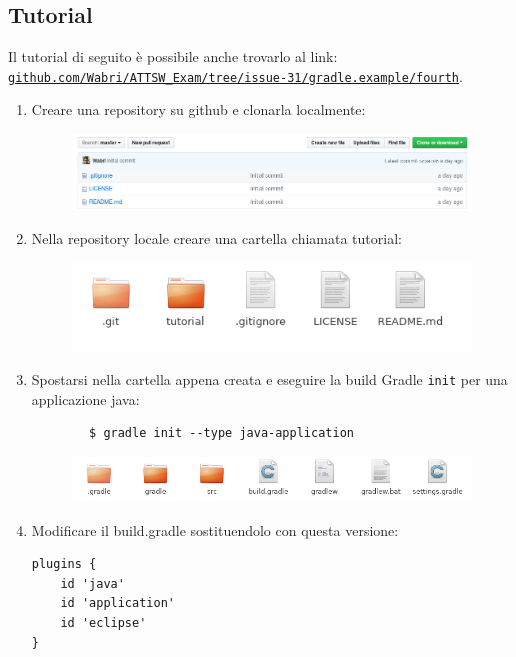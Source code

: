 \subsection{Tutorial}
Il tutorial di seguito è possibile anche trovarlo al link: \href{https://github.com/Wabri/ATTSW_Exam/tree/issue-31/gradle.example/fourth}{\texttt{github.com/Wabri/ATTSW\_Exam/tree/issue-31/gradle.example/fourth}}.
\begin{enumerate}
    \item Creare una repository su github e clonarla localmente:
    \begin{figure}[H]
    \centering
    \includegraphics[width=1\linewidth]{4IntegrationWithOtherTool/tutorial/githubRepo.png}
    \end{figure}
    \item Nella repository locale creare una cartella chiamata tutorial:
    \begin{figure}[H]
    \centering
    \includegraphics[width=0.7\linewidth]{4IntegrationWithOtherTool/tutorial/localGithubRepo.png}
    \end{figure}
    \item Spostarsi nella cartella appena creata e eseguire la build Gradle \texttt{init} per una applicazione java:
    \begin{verbatim}
        $ gradle init --type java-application
    \end{verbatim}
    \begin{figure}[H]
    \centering
    \includegraphics[width=0.8\linewidth]{4IntegrationWithOtherTool/tutorial/gradleInit.png}
    \end{figure}
    \item Modificare il build.gradle sostituendolo con questa versione:
    \begin{lstlisting}[frame=single]
plugins {
    id 'java'
    id 'application'
    id 'eclipse'
}


\end{lstlisting}
\end{enumerate}
